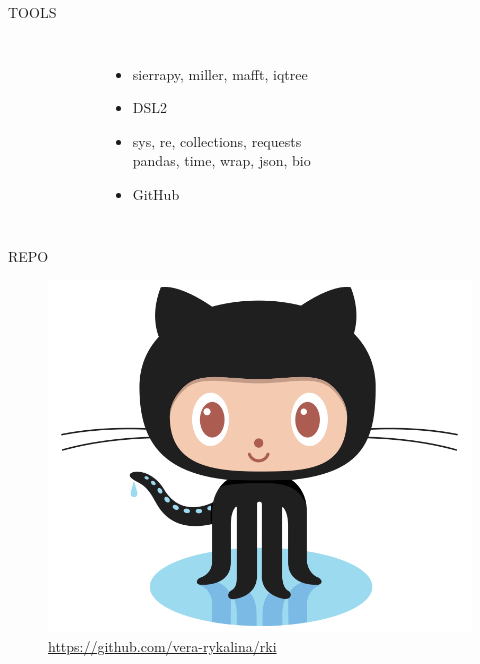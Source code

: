 \documentclass{beamer}
\begin{document}
\begin{frame}[t]{TOOLS}
\begin{columns}[onlytextwidth]
\begin{flushleft}
\begin{figure}
\end{figure}
\end{flushleft}
\centering
\begin{itemize}
\vspace{5pt}
\item \footnotesize sierrapy, miller, mafft, iqtree
\vspace{20pt}
\item \footnotesize DSL2
\vspace{20pt}
\item  \footnotesize sys, re, collections, requests\\ pandas, time, wrap, json, bio
\vspace{20pt}
\item \footnotesize GitHub

\end{itemize}
\centering
\end{columns}
\end{frame}


\begin{frame}[t]{REPO} \vspace{20pt}
\centering
\begin{figure}
\includegraphics[scale=0.2]{octocat.png}\\
\vspace{10pt}
\footnotesize {} \href{https://github.com/vera-rykalina/rki}{https://github.com/vera-rykalina/rki}
\centering
\end{figure}
\end{frame}
\end{document}
